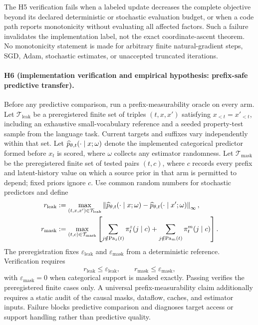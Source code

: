 The H5 verification fails when a labeled update decreases the complete objective beyond its declared deterministic or stochastic evaluation budget, or when a code path reports monotonicity without evaluating all affected factors. Such a failure invalidates the implementation label, not the exact coordinate-ascent theorem. No monotonicity statement is made for arbitrary finite natural-gradient steps, SGD, Adam, stochastic estimates, or unaccepted truncated iterations.

\paragraph{H6 (implementation verification and empirical hypothesis: prefix-safe predictive transfer).}
Before any predictive comparison, run a prefix-measurability oracle on every arm. Let $\mathcal T_{\mathrm{leak}}$ be a preregistered finite set of triples $(t,x,x')$ satisfying $x_{<t}=x'_{<t}$, including an exhaustive small-vocabulary reference and a seeded property-test sample from the language task. Current targets and suffixes vary independently within that set. Let $\widehat p_{\theta,t}(\mathord{\cdot}\mid x;\omega)$ denote the implemented categorical predictor formed before $x_t$ is scored, where $\omega$ collects any estimator randomness. Let $\mathcal T_{\mathrm{mask}}$ be the preregistered finite set of tested pairs $(t,c)$, where $c$ records every prefix and latent-history value on which a source prior in that arm is permitted to depend; fixed priors ignore $c$. Use common random numbers for stochastic predictors and define
\begin{equation}
\begin{aligned}
r_{\mathrm{leak}}
&:=
\max_{(t,x,x')\in\mathcal T_{\mathrm{leak}}}
\left\|
\widehat p_{\theta,t}(\mathord{\cdot}\mid x;\omega)
-
\widehat p_{\theta,t}(\mathord{\cdot}\mid x';\omega)
\right\|_\infty,\\
r_{\mathrm{mask}}
&:=
\max_{(t,c)\in\mathcal T_{\mathrm{mask}}}
\left[
\sum_{j\notin\operatorname{Pa}_z(t)}\pi_t^z(j\mid c)
+
\sum_{j\notin\operatorname{Pa}_m(t)}\pi_t^m(j\mid c)
\right].
\end{aligned}
\label{eq:h6-prefix-leakage-oracle}
\end{equation}
The preregistration fixes $\varepsilon_{\mathrm{leak}}$ and $\varepsilon_{\mathrm{mask}}$ from a deterministic reference. Verification requires
\begin{equation}
r_{\mathrm{leak}}\leq\varepsilon_{\mathrm{leak}},
\qquad
r_{\mathrm{mask}}\leq\varepsilon_{\mathrm{mask}},
\label{eq:h6-prefix-leakage-threshold}
\end{equation}
with $\varepsilon_{\mathrm{mask}}=0$ when categorical support is masked exactly. Passing verifies the preregistered finite cases only. A universal prefix-measurability claim additionally requires a static audit of the causal masks, dataflow, caches, and estimator inputs. Failure blocks predictive comparison and diagnoses target access or support handling rather than predictive quality.

